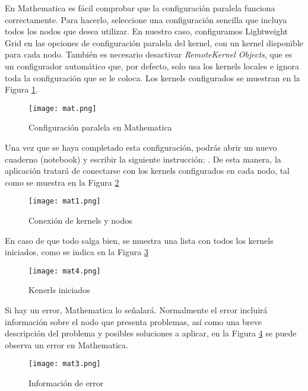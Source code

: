 \begin{spacing}{1.5}
  En Mathematica es fácil comprobar que la configuración paralela funciona
  correctamente. Para hacerlo, seleccione una configuración sencilla que
  incluya
  todos los nodos que desea utilizar. En nuestro caso, configuramos Lightweight
  Grid en las opciones de configuración paralela del kernel, con un kernel
  disponible para cada nodo. También es necesario desactivar
  \textit{RemoteKernel
    Objects}, que es un configurador automático que, por defecto, solo usa los
  kernels locales e ignora toda la configuración que se le coloca. Los kernels
  configurados se muestran en la Figura \ref{fig:etiqueta1}.  \newline  \newline

  \begin{figure}[h]
    \centering
    \texttt{[image: mat.png]}
    \caption{Configuración paralela en Mathematica}
    \label{fig:etiqueta1}
  \end{figure}

  Una vez que se haya completado esta configuración, podrás abrir un nuevo
  cuaderno (notebook) y escribir la siguiente instrucción: . De esta manera, la aplicación tratará de conectarse con los kernels
  configurados en cada nodo, tal como se muestra en la Figura
  \ref{fig:etiqueta2}

  \begin{figure}[h]
    \centering
    \texttt{[image: mat1.png]}
    \caption{Conexión de kernels y nodos}
    \label{fig:etiqueta2}
  \end{figure}

  En caso de que todo salga bien, se muestra una lista con todos los kernels
  iniciados, como se indica en la Figura \ref{fig:etiqueta3}

  \begin{figure}[h]
    \centering
    \texttt{[image: mat4.png]}
    \caption{Kenerls iniciados}
    \label{fig:etiqueta3}
  \end{figure}

  Si hay un error, Mathematica lo señalará. Normalmente el error incluirá
  información sobre el nodo que presenta problemas, así como una breve
  descripción del problema y posibles soluciones a aplicar, en la Figura
  \ref{fig:etiqueta4} se puede observa un error en Mathematica.

  \begin{figure}[h]
    \centering
    \texttt{[image: mat3.png]}
    \caption{Información de error}
    \label{fig:etiqueta4}
  \end{figure}


\end{spacing}
